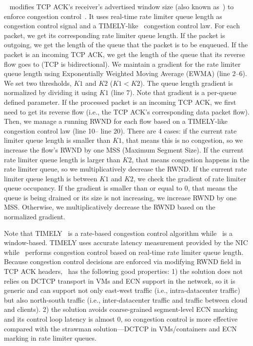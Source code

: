 ~\spring{} modifies TCP ACK's receiver's 
advertised window size (also known as~\rwnd{}) to enforce congestion control~\cite{he2016ac,vcc}.
It uses real-time rate limiter queue length as congestion control signal and 
a TIMELY-like~\cite{mittal2015timely} congestion control law.
For each packet, 
we get its corresponding rate limiter queue length.
If the packet is outgoing, we get the length of the queue that the packet is to be enqueued.
If the packet is an incoming TCP ACK, we get the length of the queue that 
its reverse flow goes to (TCP is bidirectional).  
We maintain a gradient for the rate limiter queue length using 
Exponentially Weighted Moving Average (EWMA) (line 2--6). 
We set two thresholds, $K1$ and $K2$ ($K1 < K2$). The queue length gradient is normalized by dividing it using $K1$ (line 7).
Note that gradient is a per-queue defined parameter.
If the processed packet is an incoming TCP ACK, we first need to get its reverse 
flow (i.e., the TCP ACK's corresponding data packet flow). Then, 
we manage a running RWND for each flow based on a TIMELY-like congestion control law 
(line 10-- line 20). There are 4 cases: 
if the current rate limiter queue length is smaller than $K1$, that means this is no congestion, so we 
increase the flow's RWND by one MSS (Maximum Segment Size). If the current rate limiter queue length is larger
than $K2$, that means congestion happens in the rate limiter queue, so we multiplicatively decrease the RWND. 
If the current rate limiter queue length is between $K1$ and $K2$, we check the gradient of rate limiter queue occupancy.
If the gradient is smaller than or equal to 0, that means the queue is being drained or its size is not increasing, we 
increase RWND by one MSS. Otherwise, we multiplicatively decrease the RWND based on the normalized gradient.

Note that TIMELY~\cite{mittal2015timely} is a rate-based congestion control algorithm while~\spring{} is a window-based.
TIMELY uses accurate latency measurement provided by the NIC while~\spring{} performs congestion control based on 
real-time rate limiter queue length. Because congestion control decisions are enforced via modifying RWND field in TCP ACK headers,~\spring{} has the following good properties: 
1) the solution does not relies on DCTCP transport in VMs and ECN support in the network, 
so it is generic and can support not only east-west traffic (i.e., intra-datacenter traffic) but also north-south traffic
(i.e., inter-datacenter traffic and traffic between cloud and clients). 
2) the solution avoids coarse-grained segment-level ECN marking and its control loop latency is almost 0, so congestion control
is more effective compared with the strawman solution---DCTCP in VMs/containers and ECN marking in rate limiter queues.  


